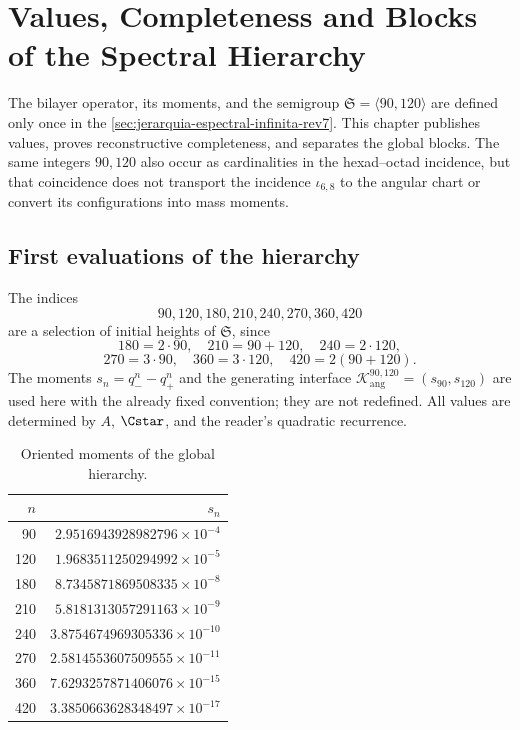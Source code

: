 \chapter{Values, Completeness and Blocks of the Spectral Hierarchy}
\label{chap:torres}

The bilayer operator, its moments, and the semigroup
\(\mathfrak S=\langle90,120\rangle\) are defined only once in the
\cref{sec:jerarquia-espectral-infinita-rev7}. This chapter publishes values,
proves reconstructive completeness, and separates the global blocks. The
same integers \(90,120\) also occur as cardinalities in the
hexad--octad incidence, but that coincidence does not transport the incidence
\(\iota_{6,8}\) to the angular chart or convert its configurations into
mass moments.

\section{First evaluations of the hierarchy}

The indices
\[
 90,120,180,210,240,270,360,420
\]
are a selection of initial heights of \(\mathfrak S\), since
\[
 180=2\cdot90,\quad210=90+120,\quad240=2\cdot120,
\]
\[
 270=3\cdot90,\quad360=3\cdot120,
 \quad420=2(90+120).
\]
The moments \(s_n=q_-^n-q_+^n\) and the generating interface
\(\mathcal K_{\mathrm{ang}}^{90,120}=(s_{90},s_{120})\) are used here with the
already fixed convention; they are not redefined. All values are
determined by \(A\), \(\Cstar\), and the reader's quadratic recurrence.

\begin{table}[htbp]
\centering
\caption{Oriented moments of the global hierarchy.}
\label{tab:torres}
\begin{tabular}{@{}rr@{}}
\toprule
\(n\)&\(s_n\)\\
\midrule
90  & \(2.9516943928982796\times10^{-4}\)\\
120 & \(1.9683511250294992\times10^{-5}\)\\
180 & \(8.7345871869508335\times10^{-8}\)\\
210 & \(5.8181313057291163\times10^{-9}\)\\
240 & \(3.8754674969305336\times10^{-10}\)\\
270 & \(2.5814553607509555\times10^{-11}\)\\
360 & \(7.6293257871406076\times10^{-15}\)\\
420 & \(3.3850663628348497\times10^{-17}\)\\
\bottomrule
\end{tabular}
\end{table}

